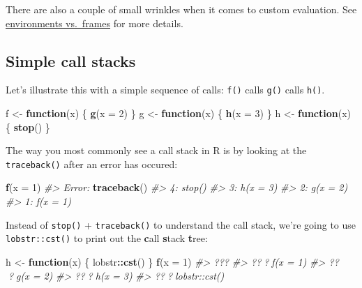 \documentclass[]{book}
\newenvironment{Shaded}{\begin{snugshade}}{\end{snugshade}}
\newcommand{\CommentTok}[1]{\textcolor[rgb]{0.56,0.35,0.01}{\textit{#1}}}
\newcommand{\ControlFlowTok}[1]{\textcolor[rgb]{0.13,0.29,0.53}{\textbf{#1}}}
\newcommand{\DataTypeTok}[1]{\textcolor[rgb]{0.13,0.29,0.53}{#1}}
\newcommand{\DecValTok}[1]{\textcolor[rgb]{0.00,0.00,0.81}{#1}}
\newcommand{\KeywordTok}[1]{\textcolor[rgb]{0.13,0.29,0.53}{\textbf{#1}}}
\newcommand{\NormalTok}[1]{#1}
\newcommand{\OperatorTok}[1]{\textcolor[rgb]{0.81,0.36,0.00}{\textbf{#1}}}
\newcommand{\StringTok}[1]{\textcolor[rgb]{0.31,0.60,0.02}{#1}}
\theoremstyle{definition}
\theoremstyle{definition}
\theoremstyle{definition}
\theoremstyle{remark}
\begin{document}
There are also a couple of small wrinkles when it comes to custom
evaluation. See \protect\hyperlink{eval-frame}{environments vs.~frames}
for more details.

\hypertarget{simple-call-stacks}{%
\subsection{Simple call stacks}\label{simple-call-stacks}}

Let's illustrate this with a simple sequence of calls: \texttt{f()}
calls \texttt{g()} calls \texttt{h()}.

\begin{Shaded}
\begin{Highlighting}[]
\NormalTok{f <-}\StringTok{ }\ControlFlowTok{function}\NormalTok{(x) \{}
  \KeywordTok{g}\NormalTok{(}\DataTypeTok{x =} \DecValTok{2}\NormalTok{)}
\NormalTok{\}}
\NormalTok{g <-}\StringTok{ }\ControlFlowTok{function}\NormalTok{(x) \{}
  \KeywordTok{h}\NormalTok{(}\DataTypeTok{x =} \DecValTok{3}\NormalTok{)}
\NormalTok{\}}
\NormalTok{h <-}\StringTok{ }\ControlFlowTok{function}\NormalTok{(x) \{}
  \KeywordTok{stop}\NormalTok{()}
\NormalTok{\}}
\end{Highlighting}
\end{Shaded}

The way you most commonly see a call stack in R is by looking at the
\texttt{traceback()} after an error has occured:

\begin{Shaded}
\begin{Highlighting}[]
\KeywordTok{f}\NormalTok{(}\DataTypeTok{x =} \DecValTok{1}\NormalTok{)}
\CommentTok{#> Error:}
\KeywordTok{traceback}\NormalTok{()}
\CommentTok{#> 4: stop()}
\CommentTok{#> 3: h(x = 3) }
\CommentTok{#> 2: g(x = 2)}
\CommentTok{#> 1: f(x = 1)}
\end{Highlighting}
\end{Shaded}

Instead of \texttt{stop()} + \texttt{traceback()} to understand the call
stack, we're going to use \texttt{lobstr::cst()} to print out the
\textbf{c}all \textbf{s}tack \textbf{t}ree:

\begin{Shaded}
\begin{Highlighting}[]
\NormalTok{h <-}\StringTok{ }\ControlFlowTok{function}\NormalTok{(x) \{}
\NormalTok{  lobstr}\OperatorTok{::}\KeywordTok{cst}\NormalTok{()}
\NormalTok{\}}
\KeywordTok{f}\NormalTok{(}\DataTypeTok{x =} \DecValTok{1}\NormalTok{)}
\CommentTok{#> ???}
\CommentTok{#> ???f(x = 1)}
\CommentTok{#>   ???g(x = 2)}
\CommentTok{#>     ???h(x = 3)}
\CommentTok{#>       ???lobstr::cst()}
\end{Highlighting}
\end{Shaded}
\end{document}
